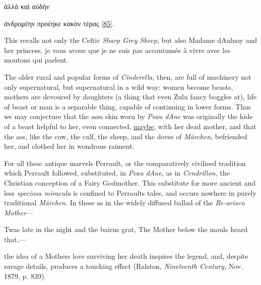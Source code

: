 \documentclass[14pt,a4paper]{memoir}
\newcommand{\ul}[1]{\uline{#1}}
\begin{document}
ἀλλἀ καὶ αὐδὴν

ἀνδρομέην προέηκε κακὸν τέρας
\protect\hypertarget{4533318093929944247_33931-h-1.htm.xhtmlux5cux23FNanchor_85}{}{}\protect\hyperlink{4533318093929944247_33931-h-1.htm.xhtmlux5cux23Footnote_85}{{[}85{]}}.

This recalls not only the Celtic \emph{Sharp Grey Sheep}, but also
Madame d\textquotesingle Aulnoy and her princess, \textquotesingle je
vous avoue que je ne suis pas accoutumée à vivre avec les moutons qui
parlent.\textquotesingle{}

The older rural and popular forms of \emph{Cinderella}, then, are full
of machinery not only supernatural, but supernatural in a wild way:
women become beasts, mothers are devoured by daughters (a thing that
even Zulu fancy boggles at), life of beast or man is a separable thing,
capable of continuing in lower forms. Thus we may conjecture that the
ass\textquotesingle s skin worn by \emph{Peau d\textquotesingle Ane} was
originally the hide of a beast helpful to her, even connected,
\ul{maybe}, with her dead mother, and that the ass, like the cow, the
calf, the sheep, and the doves of \emph{Märchen}, befriended her, and
clothed her in wondrous raiment.

For all these antique marvels Perrault, or the comparatively civilised
tradition which Perrault followed, substituted, in \emph{Peau
d\textquotesingle Ane}, as in \emph{Cendrillon}, the Christian
conception of a Fairy Godmother. This substitute for more ancient and
less \emph{speciosa miracula} is confined to Perrault\textquotesingle s
tales, and occurs nowhere in purely traditional \emph{Märchen}. In these
as in the widely diffused ballad of the \emph{Re-arisen Mother}---

{\textquotesingle Twas late in the night and the bairns grat,} {The
Mother below the mouls heard that,---}

the idea of a Mother\textquotesingle s love surviving her death inspires
the legend, and, despite savage details, produces a touching effect
(Ralston, \emph{Nineteenth Century}, Nov. 1879, p. 839).
\end{document}
